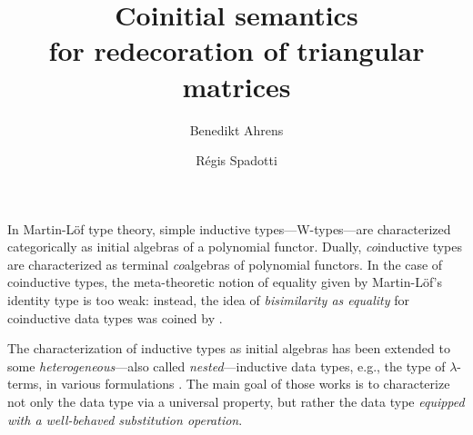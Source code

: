 \documentclass{easychair}
\begin{document}
\title{Coinitial semantics \\ for redecoration of triangular matrices}

\author{Benedikt Ahrens \and R\'egis Spadotti}



%   
%   

\maketitle




 In Martin-L\"of type theory, simple inductive types---\textsf{W}-types---are characterized categorically as initial algebras of
 a polynomial functor.
 Dually, \emph{co}inductive types are characterized as terminal \emph{co}algebras of polynomial functors.
 In the case of coinductive types, the meta-theoretic notion of equality given by Martin-L\"of's identity type is too weak: instead, the idea of 
 \emph{bisimilarity as equality} for coinductive data types was coined by \textcite{aczel_nonwellfounded}.

 
 The characterization of inductive types as initial algebras 
 has been extended to some \emph{heterogeneous}---also called \emph{nested}---inductive data types, e.g., the type of $\lambda$-terms,
 in various formulations \parencite{fpt, DBLP:journals/iandc/HirschowitzM10}.
 The main goal of those works is to characterize not only the data type via a universal property, but rather the data type
 \emph{equipped with a well-behaved substitution operation}.
 
\end{document}

